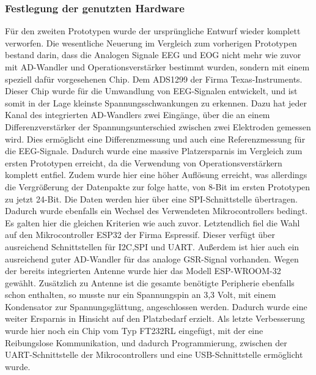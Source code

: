 \subsubsection{Festlegung der genutzten Hardware} \label{festlegung-subsubsec}

Für den zweiten Prototypen wurde der ursprüngliche Entwurf wieder komplett verworfen. Die wesentliche Neuerung im Vergleich zum vorherigen Prototypen bestand darin, dass die Analogen Signale EEG und EOG nicht mehr wie zuvor mit AD-Wandler und Operationsverstärker bestimmt wurden, sondern mit einem speziell dafür vorgesehenen Chip. Dem ADS1299 der Firma Texas-Instruments. Dieser Chip wurde für die Umwandlung von EEG-Signalen entwickelt, und ist somit in der Lage kleinste Spannungsschwankungen zu erkennen. Dazu hat jeder Kanal des integrierten AD-Wandlers zwei Eingänge, über die an einem Differenzverstärker der Spannungsunterschied zwischen zwei Elektroden gemessen wird. Dies ermöglicht eine Differenzmessung und auch eine Referenzmessung für die EEG-Signale. Dadurch wurde eine massive Platzersparnis im Vergleich zum ersten Prototypen erreicht, da die Verwendung von Operationsverstärkern komplett entfiel. Zudem wurde hier eine höher Auflösung erreicht, was allerdings die Vergrößerung der Datenpakte zur folge hatte, von 8-Bit im ersten Prototypen zu jetzt 24-Bit. Die Daten werden hier über eine SPI-Schnittstelle übertragen. Dadurch wurde ebenfalls ein Wechsel des Verwendeten Mikrocontrollers bedingt. Es galten hier die gleichen Kriterien wie auch zuvor. Letztendlich fiel die Wahl auf den Mikrocontroller ESP32 der Firma Espressif. Dieser verfügt über ausreichend Schnittstellen für I2C,SPI und UART. Außerdem ist hier auch ein ausreichend guter AD-Wandler für das analoge GSR-Signal vorhanden. Wegen der bereits integrierten Antenne wurde hier das Modell ESP-WROOM-32 gewählt. Zusätzlich zu Antenne ist die gesamte benötigte Peripherie ebenfalls schon enthalten, so musste nur ein Spannungspin an 3,3 Volt, mit einem Kondensator zur Spannungsglättung, angeschlossen werden. Dadurch wurde eine weiter Ersparnis in Hinsicht auf den Platzbedarf erzielt. Als letzte Verbesserung wurde hier noch ein Chip vom Typ FT232RL eingefügt, mit der eine Reibungslose Kommunikation, und dadurch Programmierung, zwischen der UART-Schnittstelle der Mikrocontrollers und eine USB-Schnittstelle ermöglicht wurde.




